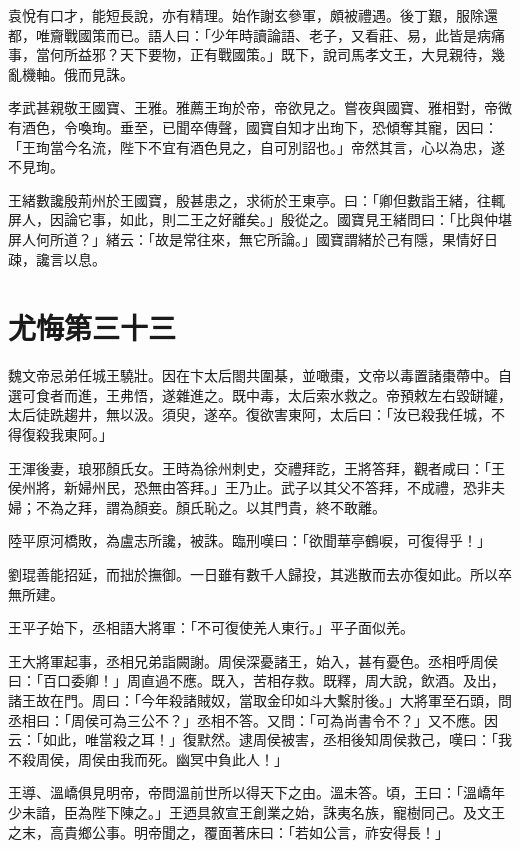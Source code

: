 袁悅有口才，能短長說，亦有精理。始作謝玄參軍，頗被禮遇。後丁艱，服除還都，唯齎戰國策而已。語人曰：「少年時讀論語、老子，又看莊、易，此皆是病痛事，當何所益邪？天下要物，正有戰國策。」既下，說司馬孝文王，大見親待，幾亂機軸。俄而見誅。

孝武甚親敬王國寶、王雅。雅薦王珣於帝，帝欲見之。嘗夜與國寶、雅相對，帝微有酒色，令喚珣。垂至，已聞卒傳聲，國寶自知才出珣下，恐傾奪其寵，因曰：「王珣當今名流，陛下不宜有酒色見之，自可別詔也。」帝然其言，心以為忠，遂不見珣。

王緒數讒殷荊州於王國寶，殷甚患之，求術於王東亭。曰：「卿但數詣王緒，往輒屏人，因論它事，如此，則二王之好離矣。」殷從之。國寶見王緒問曰：「比與仲堪屏人何所道？」緒云：「故是常往來，無它所論。」國寶謂緒於己有隱，果情好日疎，讒言以息。



\chapter{尤悔第三十三}

魏文帝忌弟任城王驍壯。因在卞太后閤共圍棊，並噉棗，文帝以毒置諸棗蔕中。自選可食者而進，王弗悟，遂雜進之。既中毒，太后索水救之。帝預敕左右毀缾罐，太后徒跣趨井，無以汲。須臾，遂卒。復欲害東阿，太后曰：「汝已殺我任城，不得復殺我東阿。」

王渾後妻，琅邪顏氏女。王時為徐州刺史，交禮拜訖，王將答拜，觀者咸曰：「王侯州將，新婦州民，恐無由答拜。」王乃止。武子以其父不答拜，不成禮，恐非夫婦；不為之拜，謂為顏妾。顏氏恥之。以其門貴，終不敢離。

陸平原河橋敗，為盧志所讒，被誅。臨刑嘆曰：「欲聞華亭鶴唳，可復得乎！」

劉琨善能招延，而拙於撫御。一日雖有數千人歸投，其逃散而去亦復如此。所以卒無所建。

王平子始下，丞相語大將軍：「不可復使羌人東行。」平子面似羌。

王大將軍起事，丞相兄弟詣闕謝。周侯深憂諸王，始入，甚有憂色。丞相呼周侯曰：「百口委卿！」周直過不應。既入，苦相存救。既釋，周大說，飲酒。及出，諸王故在門。周曰：「今年殺諸賊奴，當取金印如斗大繫肘後。」大將軍至石頭，問丞相曰：「周侯可為三公不？」丞相不答。又問：「可為尚書令不？」又不應。因云：「如此，唯當殺之耳！」復默然。逮周侯被害，丞相後知周侯救己，嘆曰：「我不殺周侯，周侯由我而死。幽冥中負此人！」

王導、溫嶠俱見明帝，帝問溫前世所以得天下之由。溫未答。頃，王曰：「溫嶠年少未諳，臣為陛下陳之。」王迺具敘宣王創業之始，誅夷名族，寵樹同己。及文王之末，高貴鄉公事。明帝聞之，覆面著床曰：「若如公言，祚安得長！」

